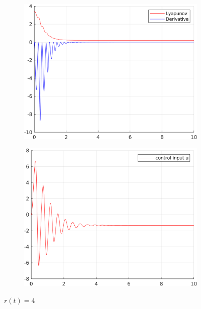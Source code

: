 \documentclass[12pt,a4paper]{article}
\begin{document}
\begin{figure}[H]
\begin{subfigure}{.45\textwidth}
			\end{subfigure}
			\begin{subfigure}{.45\textwidth}
				\centering
				\includegraphics[width=1\textwidth]{Graphics/LinearLyapunov1.png}
			\end{subfigure}%
			\begin{subfigure}{.45\textwidth}
				\centering
				\includegraphics[width=1\textwidth]{Graphics/LinearControl1.png}
			\end{subfigure}
		    \caption{$r(t) = 4$}
		\end{figure}
			
\end{document}
